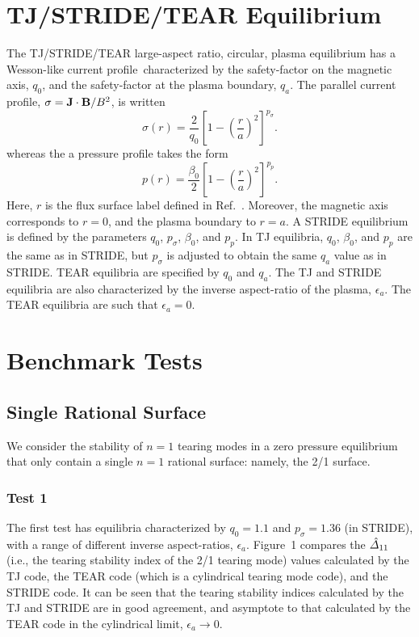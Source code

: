 \documentclass[12pt,prb,aps,notitlepage]{revtex4-1}
\begin{document}
\section{TJ/STRIDE/TEAR  Equilibrium}
The TJ/STRIDE/TEAR large-aspect ratio, circular,  plasma equilibrium  has a Wesson-like current profile\,\cite{wesson} characterized by the
safety-factor on the magnetic axis, $q_0$, and the safety-factor at the plasma boundary, $q_a$. 
The
 parallel current profile, $\sigma={\bf J}\cdot{\bf B}/B^2$,  is written
\begin{equation}
\sigma(r) = \frac{2}{q_0}\left[1-\left(\frac{r}{a}\right)^2\right]^{p_\sigma}.
\end{equation}
whereas the a  pressure profile takes the form
\begin{equation}
p(r)= \frac{\beta_0}{2}\left[1-\left(\frac{r}{a}\right)^2\right]^{p_p}.
\end{equation}
Here, $r$ is the flux surface label defined in Ref.~. Moreover, the magnetic axis corresponds to $r=0$, and the plasma
boundary to $r=a$. A STRIDE equilibrium is defined by the parameters $q_0$, $p_\sigma$, $\beta_0$, and $p_p$. In TJ equilibria,
$q_0$, $\beta_0$, and $p_p$ are the same as in STRIDE, but $p_\sigma$ is adjusted to obtain the same $q_a$ value as in STRIDE. 
TEAR equilibria are specified by $q_0$ and $q_a$. 
The TJ and STRIDE equilibria are also characterized by the inverse aspect-ratio of the plasma, $\epsilon_a$. The TEAR equilibria are such that
$\epsilon_a=0$. 

\section{Benchmark Tests}
\subsection{Single Rational Surface}
We consider the stability of $n=1$ tearing modes 
in a zero pressure equilibrium that only contain a single $n=1$ rational surface: namely, the 2/1 surface. 

\subsubsection{Test 1}
The first test has equilibria characterized by $q_0=1.1$ and $p_\sigma=1.36$ (in STRIDE), with a range of different inverse aspect-ratios, $\epsilon_a$. 
Figure~1 compares the $\hat{\mit\Delta}_{11}$ (i.e.,
the tearing stability index of the 2/1 tearing mode) values calculated by the TJ code,\cite{tj} the TEAR code (which is a cylindrical tearing mode code), and
the STRIDE code. It can be seen that the tearing stability indices calculated by the TJ and STRIDE are in good agreement, and asymptote to that calculated by the TEAR code
in the cylindrical limit, $\epsilon_a\rightarrow 0$. 
\end{document}
